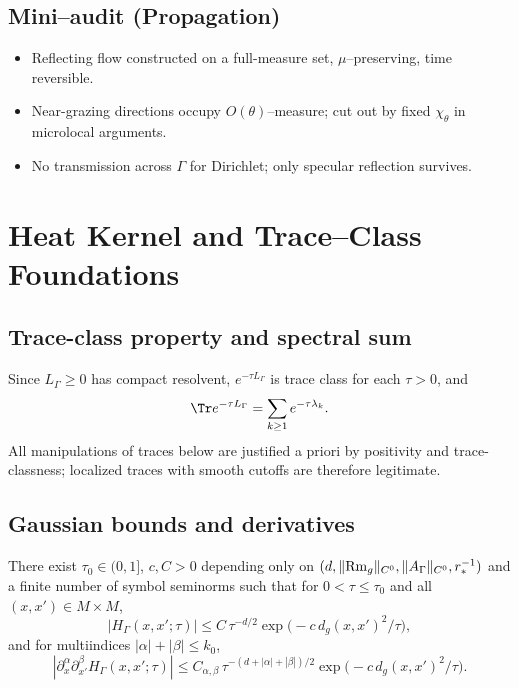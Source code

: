 \subsection*{Mini–audit (Propagation)}
\begin{itemize}
  \item Reflecting flow constructed on a full-measure set, $\mu$–preserving, time reversible.
  \item Near-grazing directions occupy $O(\theta)$–measure; cut out by fixed $\chi_\theta$ in microlocal arguments.
  \item No transmission across $\Gamma$ for Dirichlet; only specular reflection survives.
\end{itemize}

\section{Heat Kernel and Trace–Class Foundations}
\label{sec:heat-trace-prep}

\subsection{Trace-class property and spectral sum}
Since $L_\Gamma\ge0$ has compact resolvent, $e^{-\tau L_\Gamma}$ is trace class for each $\tau>0$, and
\[
\Tr e^{-\tau L_\Gamma}=\sum_{k\ge1} e^{-\tau\lambda_k}.
\]
All manipulations of traces below are justified a priori by positivity and trace-classness; localized traces with smooth cutoffs are therefore legitimate.

\subsection{Gaussian bounds and derivatives}
\begin{proposition}
\label{prop:gaussian-bounds}
There exist $\tau_0\in(0,1]$, $c,C>0$ depending only on $(d,\|{\rm Rm}_g\|_{C^0},\|A_\Gamma\|_{C^0},r_*^{-1})$ and a finite number of symbol seminorms such that for $0<\tau\le \tau_0$ and all $(x,x')\in M\times M$,
\[
|H_\Gamma(x,x';\tau)| \le C\,\tau^{-d/2}\exp\!\big(-c\,d_g(x,x')^2/\tau\big),
\]
and for multiindices $|\alpha|+|\beta|\le k_0$,
\[
|\partial_x^\alpha \partial_{x'}^\beta H_\Gamma(x,x';\tau)|
\le C_{\alpha,\beta}\,\tau^{-(d+|\alpha|+|\beta|)/2}\exp\!\big(-c\,d_g(x,x')^2/\tau\big).
\]
\end{proposition}

